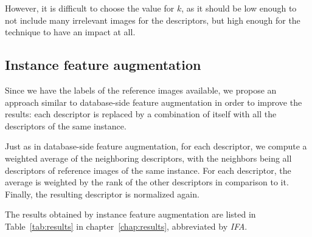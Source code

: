 However, it is difficult to choose the value for $k$, as
it should be low enough to not include many irrelevant
images for the descriptors, but high enough for the
technique to have an impact at all.

\subsection{Instance feature augmentation}\label{sec:ifa}
Since we have the labels of the reference images
available, we propose an approach similar to
database-side feature augmentation in order to
improve the results: each descriptor is replaced by a
combination of itself with all the descriptors of the same instance.

Just as in database-side feature augmentation, for each descriptor,
we compute a weighted average of the neighboring descriptors, with the
neighbors being all descriptors of reference images of the same instance.
For each descriptor, the average is weighted by the rank of the other
descriptors in comparison to it. Finally, the resulting descriptor
is normalized again.

The results obtained by instance feature augmentation are listed in Table~\ref{tab:results} in chapter~\ref{chap:results}, abbreviated by \emph{IFA}.

